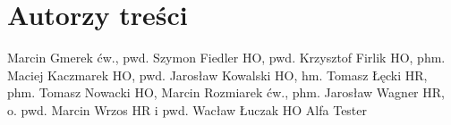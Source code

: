 \chapter{Autorzy treści}

Marcin Gmerek ćw., 
pwd. Szymon Fiedler HO, 
pwd. Krzysztof Firlik HO, 
phm. Maciej Kaczmarek HO, 
pwd. Jarosław Kowalski HO, 
hm. Tomasz Łęcki HR, 
phm. Tomasz Nowacki HO, 
Marcin Rozmiarek ćw., 
phm. Jarosław Wagner HR, 
o. pwd. Marcin Wrzos HR 
i pwd. Wacław Łuczak HO
Alfa Tester